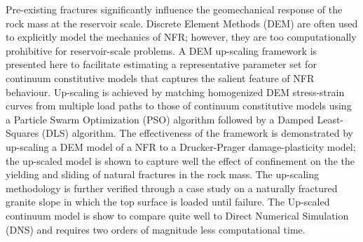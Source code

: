 Pre-existing fractures significantly influence the geomechanical response of the rock mass at the reservoir scale.  Discrete Element Methods (DEM) are often used to explicitly model the mechanics of NFR; however, they are too computationally prohibitive for reservoir-scale problems. A DEM up-scaling framework is presented here to facilitate estimating a representative parameter set for continuum constitutive models that captures the salient feature of NFR behaviour. Up-scaling is achieved by matching homogenized DEM stress-strain curves from multiple load paths to those of continuum constitutive models using a Particle Swarm Optimization (PSO) algorithm followed by a Damped Least-Squares (DLS) algorithm. The effectiveness of the framework is demonstrated by up-scaling a DEM model of a NFR to a Drucker-Prager damage-plasticity model; the up-scaled model is shown to capture well the effect of confinement on the the yielding and sliding of natural fractures in the rock mass. The up-scaling methodology is further verified through a case study on a naturally fractured granite slope in which the top surface is loaded until failure. The Up-scaled continuum model is show to compare quite well to Direct Numerical Simulation (DNS) and requires two orders of magnitude less computational time.